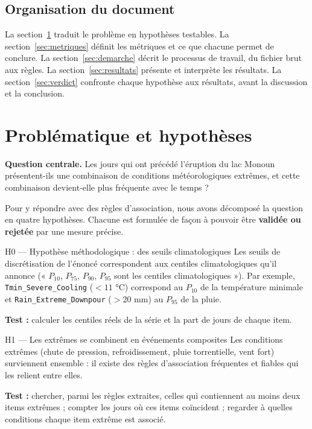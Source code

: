 \documentclass[12pt, a4paper]{article}
\newcommand{\itm}[1]{\texttt{#1}}
\begin{document}
\subsection{Organisation du document}

La section~\ref{sec:hypotheses} traduit le problème en hypothèses testables. La
section~\ref{sec:metriques} définit les métriques et ce que chacune permet de conclure. La
section~\ref{sec:demarche} décrit le processus de travail, du fichier brut aux règles. La
section~\ref{sec:resultats} présente et interprète les résultats. La
section~\ref{sec:verdict} confronte chaque hypothèse aux résultats, avant la discussion et la
conclusion.

\section{Problématique et hypothèses}
\label{sec:hypotheses}

\begin{formule}
\textbf{Question centrale.} Les jours qui ont précédé l'éruption du lac Monoun présentent-ils
une combinaison de conditions météorologiques extrêmes, et cette combinaison devient-elle plus
fréquente avec le temps ?
\end{formule}

Pour y répondre avec des règles d'association, nous avons décomposé la question en quatre
hypothèses. Chacune est formulée de façon à pouvoir être \textbf{validée ou rejetée} par une
mesure précise.

\begin{hypothese}{H0 — Hypothèse méthodologique : des seuils climatologiques}
Les seuils de discrétisation de l'énoncé correspondent aux centiles climatologiques qu'il
annonce (« $P_{10}$, $P_{75}$, $P_{90}$, $P_{95}$ sont les centiles climatologiques »). Par
exemple, \itm{Tmin\_Severe\_Cooling} ($< 11$ °C) correspond au $P_{10}$ de la température
minimale et \itm{Rain\_Extreme\_Downpour} ($> 20$ mm) au $P_{95}$ de la pluie.

\textbf{Test :} calculer les centiles réels de la série et la part de jours de chaque item.
\end{hypothese}

\begin{hypothese}{H1 — Les extrêmes se combinent en événements composites}
Les conditions extrêmes (chute de pression, refroidissement, pluie torrentielle, vent fort)
surviennent ensemble : il existe des règles d'association fréquentes et fiables qui les
relient entre elles.

\textbf{Test :} chercher, parmi les règles extraites, celles qui contiennent au moins deux items
extrêmes ; compter les jours où ces items coïncident ; regarder à quelles conditions chaque item
extrême est associé.
\end{hypothese}
\end{document}

